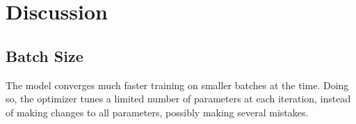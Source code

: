\chapter{Discussion}\label{ch:Discussion}

\section{Batch Size}

The model converges much faster training on smaller batches at the time. Doing so, the optimizer tunes a limited number of parameters at each iteration, instead of making changes to all parameters, possibly making several mistakes.
